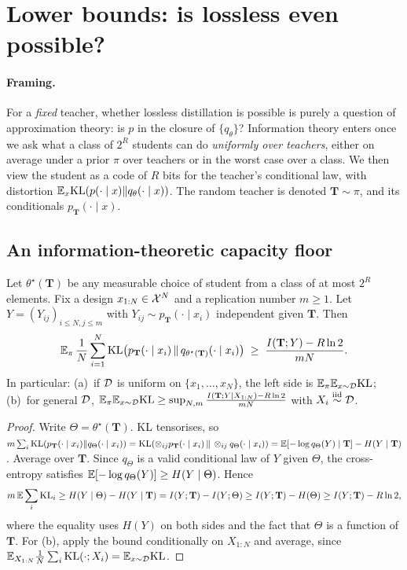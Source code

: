 \section{Lower bounds: is lossless even possible?}\label{sec:lower}

\paragraph{Framing.}
For a \emph{fixed} teacher, whether lossless distillation is possible is purely a question of
approximation theory: is $p$ in the closure of $\{q_\theta\}$? Information theory enters once we ask
what a class of $2^R$ students can do \emph{uniformly over teachers}, either on average under a prior
$\pi$ over teachers or in the worst case over a class. We then view the student as a code of $R$ bits for
the teacher's conditional law, with distortion $\mathbb{E}_x\mathrm{KL}(p(\cdot\mid x)\|q_\theta(\cdot\mid x))$. The random
teacher is denoted $\mathbf T\sim\pi$, and its conditionals $p_{\mathbf T}(\cdot\mid x)$.

\subsection{An information-theoretic capacity floor}

\begin{theorem}\label{thm:capacity}
\Ck Let $\theta^\star(\mathbf T)$ be any measurable choice of student from a class
of at most $2^R$ elements. Fix a design $x_{1:N}\in\mathcal{X}^N$ and a replication number $m\ge1$. Let
$Y=(Y_{ij})_{i\le N,j\le m}$ with $Y_{ij}\sim p_{\mathbf T}(\cdot\mid x_i)$ independent given $\mathbf T$. Then
\[
\mathbb{E}_\pi\,\frac1N\sum_{i=1}^N\mathrm{KL}\big(p_{\mathbf T}(\cdot\mid x_i)\,\|\,q_{\theta^\star(\mathbf T)}(\cdot\mid x_i)\big)\;\ge\;\frac{I(\mathbf T;Y)-R\ln2}{mN}.
\]
In particular:
(a)~if $\mathcal{D}$ is uniform on $\{x_1,\dots,x_N\}$, the left side is $\mathbb{E}_\pi\mathbb{E}_{x\sim\mathcal{D}}\mathrm{KL}$;
(b)~for general $\mathcal{D}$,
$\mathbb{E}_\pi\mathbb{E}_{x\sim\mathcal{D}}\mathrm{KL}\ge\sup_{N,m}\frac{I(\mathbf T;Y\mid X_{1:N})-R\ln2}{mN}$ with $X_i\overset{\text{iid}}\sim\mathcal{D}$.
\end{theorem}
\begin{proof}
Write $\Theta=\theta^\star(\mathbf T)$. KL tensorises, so
$m\sum_i\mathrm{KL}(p_{\mathbf T}(\cdot\mid x_i)\|q_\Theta(\cdot\mid x_i))=\mathrm{KL}(\otimes_{ij}p_{\mathbf T}(\cdot\mid x_i)\,\|\,\otimes_{ij}q_\Theta(\cdot\mid x_i))
=\mathbb{E}[-\log q_\Theta(Y)\mid\mathbf T]-H(Y\mid\mathbf T)$.
Average over $\mathbf T$. Since $q_\Theta$ is a valid conditional law of $Y$ given $\Theta$, the
cross-entropy satisfies $\mathbb{E}[-\log q_\Theta(Y)]\ge H(Y\mid\Theta)$. Hence
\[
m\,\mathbb{E}\sum_i\mathrm{KL}_i\ge H(Y\mid\Theta)-H(Y\mid\mathbf T)=I(Y;\mathbf T)-I(Y;\Theta)\ge I(Y;\mathbf T)-H(\Theta)\ge I(Y;\mathbf T)-R\ln2,
\]
where the equality uses $H(Y)$ on both sides and the fact that $\Theta$ is a function of $\mathbf T$.
For (b), apply the bound conditionally on $X_{1:N}$ and average, since
$\mathbb{E}_{X_{1:N}}\frac1N\sum_i\mathrm{KL}(\cdot;X_i)=\mathbb{E}_{x\sim\mathcal{D}}\mathrm{KL}$.
\end{proof}


